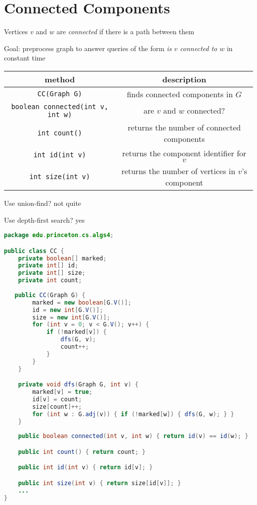 \documentclass[8pt,a4paper,compress]{beamer}
\begin{document}
\section{Connected Components}
\begin{frame}[fragile]
Vertices $v$ and $w$ are \emph{connected} if there is a path between them

\bigskip

Goal: preprocess graph to answer queries of the form \emph{is $v$ connected to $w$} in constant time

\begin{center}
\begin{tabular}{cc}
method & description \\ \hline
\lstinline$CC(Graph G)$ & finds connected components in $G$ \\
\lstinline$boolean connected(int v, int w)$ & are $v$ and $w$ connected? \\
\lstinline$int count()$ & returns the number of connected components \\
\lstinline$int id(int v)$ & returns the component identifier for $v$ \\
\lstinline$int size(int v)$ & returns the number of vertices in $v$'s component
\end{tabular} 
\end{center}

\bigskip

Use union-find? not quite

\bigskip

Use depth-first search? yes
\end{frame}

\begin{frame}[fragile]
\begin{lstlisting}[language=Java]
package edu.princeton.cs.algs4;

public class CC {
    private boolean[] marked; 
    private int[] id; 
    private int[] size;  
    private int count;  
    
   public CC(Graph G) {
        marked = new boolean[G.V()];
        id = new int[G.V()];
        size = new int[G.V()];
        for (int v = 0; v < G.V(); v++) {
            if (!marked[v]) {
                dfs(G, v);
                count++;
            }
        }
    }

    private void dfs(Graph G, int v) {
        marked[v] = true;
        id[v] = count;
        size[count]++;
        for (int w : G.adj(v)) { if (!marked[w]) { dfs(G, w); } }
    }
    
    public boolean connected(int v, int w) { return id(v) == id(w); }

    public int count() { return count; }

    public int id(int v) { return id[v]; }

    public int size(int v) { return size[id[v]]; }
    ...
}
\end{lstlisting} 
\end{frame}
\end{document}
